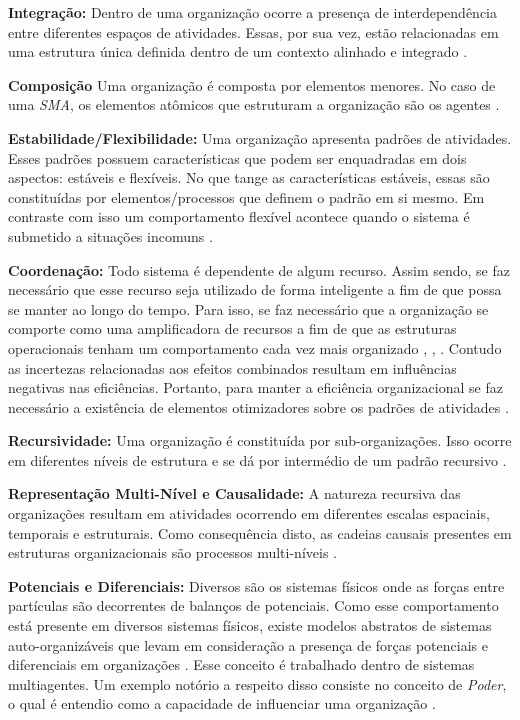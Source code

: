 \textbf{Integração:} Dentro de uma organização ocorre a presença de interdependência entre diferentes espaços de atividades. Essas, por sua vez, estão relacionadas em uma estrutura única definida dentro de um contexto alinhado e integrado \cite{organiationofmultiagentsystem}.

\textbf{Composição} Uma organização é composta por elementos menores. No caso de uma \textit{SMA}, os elementos atômicos que estruturam a organização são os agentes \cite{organiationofmultiagentsystem}.

\textbf{Estabilidade/Flexibilidade:} Uma organização apresenta padrões de atividades. Esses padrões possuem características que podem ser enquadradas em dois aspectos: estáveis e flexíveis. No que tange as características estáveis, essas são constituídas por elementos/processos que definem o padrão em si mesmo. Em contraste com isso um comportamento flexível acontece quando o sistema é submetido a situações incomuns \cite{organiationofmultiagentsystem}.

\textbf{Coordenação:} Todo sistema é dependente de algum recurso. Assim sendo, se faz necessário que esse recurso seja utilizado de forma inteligente a fim de que possa se manter ao longo do tempo. Para isso, se faz necessário que a organização se comporte como uma amplificadora de recursos a fim de que as estruturas operacionais tenham um comportamento cada vez mais organizado \cite{selforganization}, \cite{selforganizatioenvoriment}, \cite{defintionselforganization}. Contudo as incertezas relacionadas aos efeitos combinados resultam em influências negativas nas eficiências. Portanto, para manter a eficiência organizacional se faz necessário a existência de elementos otimizadores sobre os padrões de atividades \cite{organiationofmultiagentsystem}.

\textbf{Recursividade:} Uma organização é constituída por sub-organizações. Isso ocorre em diferentes níveis de estrutura e se dá por intermédio de um padrão recursivo \cite{organiationofmultiagentsystem}.

\textbf{Representação Multi-Nível e Causalidade:} A natureza recursiva das organizações resultam em atividades ocorrendo em diferentes escalas espaciais, temporais e estruturais. Como consequência disto, as cadeias causais presentes em estruturas organizacionais são processos multi-níveis \cite{organiationofmultiagentsystem}.

\textbf{Potenciais e Diferenciais:} Diversos são os sistemas físicos onde as forças entre partículas são decorrentes de balanços de potenciais. Como esse comportamento está presente em diversos sistemas físicos, existe modelos abstratos de sistemas auto-organizáveis que levam em consideração a presença de forças potenciais e diferenciais em organizações \cite{selforganizationdiffforce}. Esse conceito é trabalhado dentro de sistemas multiagentes. Um exemplo notório a respeito disso consiste no conceito de \textit{Poder}, o qual é entendio como a capacidade de influenciar uma organização \cite{organiationofmultiagentsystem}.

